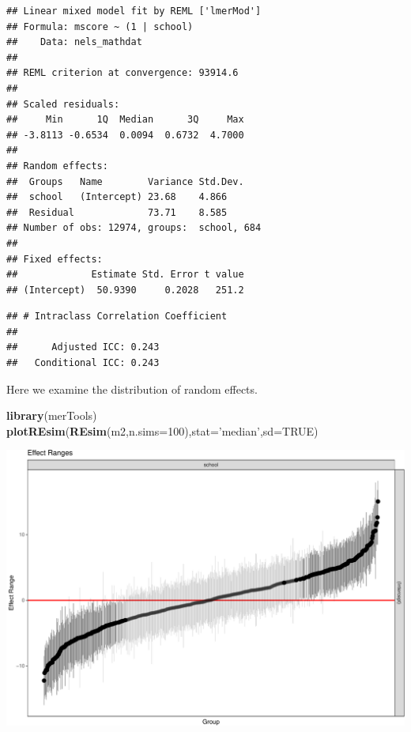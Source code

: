 \documentclass[ignorenonframetext,]{beamer}
\newenvironment{Shaded}{\begin{snugshade}}{\end{snugshade}}
\newcommand{\KeywordTok}[1]{\textcolor[rgb]{0.13,0.29,0.53}{\textbf{#1}}}
\newcommand{\DataTypeTok}[1]{\textcolor[rgb]{0.13,0.29,0.53}{#1}}
\newcommand{\DecValTok}[1]{\textcolor[rgb]{0.00,0.00,0.81}{#1}}
\newcommand{\StringTok}[1]{\textcolor[rgb]{0.31,0.60,0.02}{#1}}
\newcommand{\OtherTok}[1]{\textcolor[rgb]{0.56,0.35,0.01}{#1}}
\newcommand{\NormalTok}[1]{#1}
\begin{document}
\begin{frame}[fragile]{}

\begin{verbatim}
## Linear mixed model fit by REML ['lmerMod']
## Formula: mscore ~ (1 | school)
##    Data: nels_mathdat
## 
## REML criterion at convergence: 93914.6
## 
## Scaled residuals: 
##     Min      1Q  Median      3Q     Max 
## -3.8113 -0.6534  0.0094  0.6732  4.7000 
## 
## Random effects:
##  Groups   Name        Variance Std.Dev.
##  school   (Intercept) 23.68    4.866   
##  Residual             73.71    8.585   
## Number of obs: 12974, groups:  school, 684
## 
## Fixed effects:
##             Estimate Std. Error t value
## (Intercept)  50.9390     0.2028   251.2
\end{verbatim}

\begin{verbatim}
## # Intraclass Correlation Coefficient
## 
##      Adjusted ICC: 0.243
##   Conditional ICC: 0.243
\end{verbatim}

\end{frame}

\begin{frame}[fragile]{}

Here we examine the distribution of random effects.

\begin{Shaded}
\begin{Highlighting}[]
\KeywordTok{library}\NormalTok{(merTools)}
\KeywordTok{plotREsim}\NormalTok{(}\KeywordTok{REsim}\NormalTok{(m2,}\DataTypeTok{n.sims=}\DecValTok{100}\NormalTok{),}\DataTypeTok{stat=}\StringTok{'median'}\NormalTok{,}\DataTypeTok{sd=}\OtherTok{TRUE}\NormalTok{)}
\end{Highlighting}
\end{Shaded}

\end{frame}

\begin{frame}{}

\includegraphics{anova_06_deck_files/figure-beamer/plotre2-1.pdf}

\end{frame}
\end{document}
